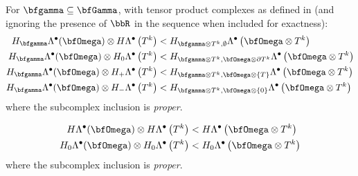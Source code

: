             \line
            \begin{lemma}
                For $\bfgamma  \subseteq  \bfGamma$, with tensor product complexes as defined in \cite{ABB15} (and ignoring the presence of $\bbR$ in the sequence when included for exactness):
                \begin{align}
                    H_{\bfgamma}\Lambda^{\bullet}(\bfOmega)\otimes H\Lambda^{\bullet}\left(T^{k}\right)  &<  H_{\bfgamma\otimes T^{k}, \emptyset}\Lambda^{\bullet}\left(\bfOmega\otimes T^{k}\right)  \\
                    H_{\bfgamma}\Lambda^{\bullet}(\bfOmega)\otimes H_{0}\Lambda^{\bullet}\left(T^{k}\right)  &<  H_{\bfgamma\otimes T^{k}, \bfOmega\otimes\partial T^{k}}\Lambda^{\bullet}\left(\bfOmega\otimes T^{k}\right)  \\
                    H_{\bfgamma}\Lambda^{\bullet}(\bfOmega)\otimes H_{+}\Lambda^{\bullet}\left(T^{k}\right)  &<  H_{\bfgamma\otimes T^{k}, \bfOmega\otimes\{T\}}\Lambda^{\bullet}\left(\bfOmega\otimes T^{k}\right)  \\
                    H_{\bfgamma}\Lambda^{\bullet}(\bfOmega)\otimes H_{-}\Lambda^{\bullet}\left(T^{k}\right)  &<  H_{\bfgamma\otimes T^{k}, \bfOmega\otimes\{0\}}\Lambda^{\bullet}\left(\bfOmega\otimes T^{k}\right)
                \end{align}
                where the subcomplex inclusion is \emph{proper}.
            \end{lemma}

            \begin{corollary}\label{cor:tensor product complex inclusion}
                \begin{align}
                    H\Lambda^{\bullet}(\bfOmega)\otimes H\Lambda^{\bullet}\left(T^{k}\right)  &<  H\Lambda^{\bullet}\left(\bfOmega\otimes T^{k}\right)  \\
                    H_{0}\Lambda^{\bullet}(\bfOmega)\otimes H_{0}\Lambda^{\bullet}\left(T^{k}\right)  &<  H_{0}\Lambda^{\bullet}\left(\bfOmega\otimes T^{k}\right)
                \end{align}
                where the subcomplex inclusion is \emph{proper}.
            \end{corollary}
            \line
    